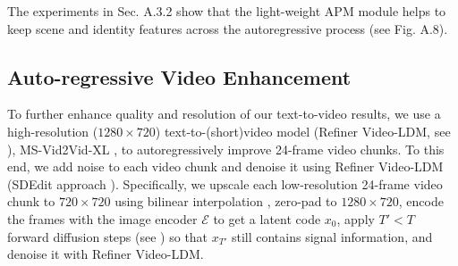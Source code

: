 The experiments in 
Sec. \textcolor{linkblue}{A.3.2}
show that the light-weight APM module helps to keep scene and identity features across the autoregressive process 
(see Fig. \textcolor{linkblue}{A.8}).

\subsection{Auto-regressive Video Enhancement}
\label{ssec:autoreg-enhancer}
To further enhance quality and resolution of our text-to-video results, we use a high-resolution ($1280 \times 720$) text-to-(short)video model (Refiner Video-LDM, see ), \eg MS-Vid2Vid-XL  \cite{wang2024videocomposer,2023i2vgenxl}, to autoregressively improve 24-frame video chunks. To this end, we add noise to each video chunk and denoise it using Refiner Video-LDM (SDEdit approach \cite{meng2021sdedit}). Specifically, we upscale each low-resolution 24-frame video chunk to $720 \times 720$ using bilinear interpolation \cite{amidror2002scattered}, zero-pad to $1280 \times 720$, encode the frames with the image encoder $\mathcal{E}$ to get a latent code $x_{0}$, apply $T' <T$ forward diffusion steps (see ) so that $x_{T'}$  still contains signal information, and denoise it with Refiner Video-LDM.


